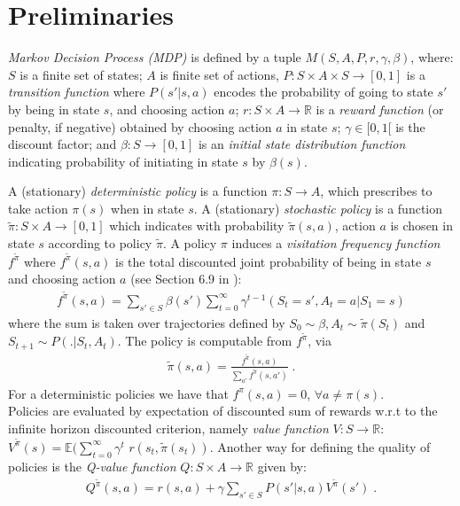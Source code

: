 \documentclass[runningheads,a4paper]{llncs}
\begin{document}
\section{Preliminaries}\label{sec:Preliminaries}
\textit{Markov Decision Process (MDP)} \citep{Puterman1994} is defined by a tuple $M(S, A, P, r, \gamma, \beta)$, where: $S$ is a finite set of states; $A$ is finite set of actions, $P: S \times A \times S \longrightarrow [0,1]$ is a \textit{transition function} where $P(s'|s,a)$ encodes the probability of going to state $s'$ by being in state $s$, and choosing action $a$; $r: S \times A \longrightarrow \mathbb{R}$ is a \textit{reward function} (or penalty, if negative) obtained by choosing action $a$ in state $s$; $\gamma \in [0, 1[$ is the discount factor; and $\beta: S \longrightarrow [0,1]$ is an \textit{initial state distribution function} indicating probability of initiating in state $s$ by $\beta(s)$.

A (stationary) \textit{deterministic policy} is a function $\pi: S \longrightarrow A$, which prescribes to take action $\pi(s)$ when in state $s$. A (stationary) \textit{stochastic policy} is a function $\tilde{\pi}: S \times A \longrightarrow [0,1]$ which indicates with probability $\tilde{\pi} (s,a)$, action $a$ is chosen in state $s$ according to policy $\tilde{\pi}$. A policy $\pi$ induces a \textit{visitation frequency function} $f^{\tilde{\pi}}$ where $f^{\tilde{\pi}}(s,a)$ is the total discounted joint probability of being in state $s$ and choosing action $a$ (see Section $6.9$ in \cite{Puterman1994}):
\begin{align*}
f^{\tilde{\pi}}(s, a) = \sum_{s' \in S} \beta(s') \sum_{t=0}^{\infty} \gamma^{t-1}(S_t = s', A_t = a | S_1 = s)
\end{align*}
where the sum is taken over trajectories defined by $S_0 \sim \beta, A_t \sim \tilde{\pi}(S_t)$ and $S_{t+1} \sim P(.|S_t,A_t)$. The policy is computable from $f^{\tilde{\pi}}$, via 
\begin{align}\label{pi_f}
\tilde{\pi}(s,a) = \frac{f^{\tilde{\pi}}(s, a)}{\sum_{a'} f^{\tilde{\pi}} (s,a')}\;.
\end{align}
For a deterministic policies we have that $f^{\pi}(s,a)= 0$, $\forall a \neq \pi(s)$.\\
Policies are evaluated by expectation of discounted sum of rewards w.r.t to the infinite horizon discounted criterion, namely \textit{value function} $V: S \longrightarrow \mathbb{R}$: 
$V^{\tilde{\pi}}(s) = \mathbb{E}(\sum_{t=0}^{\infty} \gamma^{t}$ $r(s_t, \tilde{\pi}(s_t))$. %
Another way for defining the quality of policies is the \textit{Q-value function}   $Q: S \times A \longrightarrow \mathbb{R}$ given by:
\begin{align}\label{q-v}
Q^{\tilde{\pi}}(s, a) = r(s, a) + \gamma \sum_{s' \in S} P(s'|s,a)V^{\tilde{\pi}}(s')\;.
\end{align}
\end{document}
